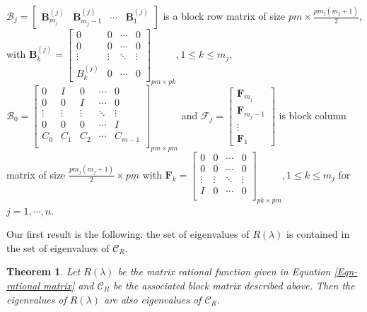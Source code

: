 \documentclass[12pt, reqno]{amsart}
\newtheorem{theorem}{Theorem}[section]
\theoremstyle{definition}
\theoremstyle{remark}
\numberwithin{equation}{section}
\begin{document}
\noindent
$\mathcal{B}_j = \begin{bmatrix}
\textbf{B}_{m_j}^{(j)} & \textbf{B}_{m_j-1}^{(j)} & \cdots & \textbf{B}_1^{(j)}
\end{bmatrix}$ is a block row matrix of size $\displaystyle pm \times 
\frac{pm_j(m_j+1)}{2}$, with $\textbf{B}_k^{(j)} = \begin{bmatrix}
0 & 0 & \cdots & 0 \\
0 & 0 & \cdots & 0 \\
\vdots & \vdots & \ddots & \vdots \\
B_{k}^{(j)} & 0 & \cdots & 0
\end{bmatrix}_{pm \times pk}, 1 \leq k \leq m_j $, \\
$\mathcal{B}_0 = \begin{bmatrix}
0 & I & 0 & \cdots & 0\\
0 & 0 & I & \cdots & 0\\
\vdots & \vdots & \vdots & \ddots & \vdots\\
0 & 0 & 0 & \cdots & I\\
C_0 & C_1 & C_2 & \cdots & C_{m-1}\\ 
\end{bmatrix}_{pm \times pm}$ and
$\mathcal{F}_j = \begin{bmatrix}
\textbf{F}_{m_j} \\
\textbf{F}_{m_j-1} \\
\vdots \\
\textbf{F}_1
\end{bmatrix}$ is block column matrix of size $\displaystyle \frac{pm_j(m_j+1)}{2} 
\times pm$ with $ \textbf{F}_k =\begin{bmatrix}
0 & 0 & \cdots & 0\\
0 & 0 & \cdots & 0\\
\vdots & \vdots & \ddots & \vdots \\
I & 0 & \cdots & 0 \\
\end{bmatrix}_{pk \times pm}, 1 \leq k \leq m_j$ for $j = 1,\cdots, n$.

\medskip
Our first result is the following: the set of eigenvalues of $R(\lambda)$ is contained 
in the set of eigenvalues of $\mathcal{C}_R$.

\begin{theorem}\label{Thm- eigenvalues- matrix rational function}
Let $R(\lambda)$ be the matrix rational function given in Equation \eqref{Eqn- rational matrix} 
and $\mathcal{C}_R$ be the associated block 
matrix described above. Then the eigenvalues of $R(\lambda)$ are also eigenvalues of 
$\mathcal{C}_R$.
\end{theorem}
\end{document}
